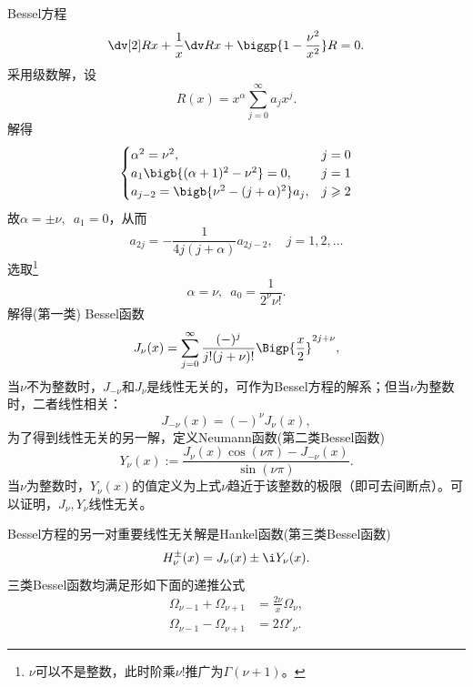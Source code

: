 Bessel方程
\begin{equation}
    \dv[2]Rx+\frac1x\dv Rx+\biggp{1-\frac{\nu^2}{x^2}}R=0.
\end{equation}
采用级数解，设 
\[
    R(x)=x^\alpha\sum_{j=0}^\infty a_jx^j.
\]
解得
\[
    \begin{cases}
        \alpha^2=\nu^2,&j=0\\
        a_1\bigb{(\alpha+1)^2-\nu^2}=0,&j=1\\
        a_{j-2}=\bigb{\nu^2-(j+\alpha)^2}a_j,&j\geqslant 2
    \end{cases}
\]
故$\alpha=\pm\nu,\enspace a_1=0$，从而
\[
    a_{2j}=-\frac1{4j(j+\alpha)}a_{2j-2},\quad j=1,2,\ldots
\]
选取\footnote{$\nu$可以不是整数，此时阶乘$\nu!$推广为$\Gamma(\nu+1)$。}
\[
    \alpha=\nu,\enspace a_0=\frac1{2^\nu\nu!}.
\]
解得(第一类) Bessel函数
\begin{equation}
    J_\nu(x)=\sum_{j=0}^\infty\frac{(-)^j}{j!(j+\nu)!}\Bigp{\frac x2}^{2j+\nu},
\end{equation}
当$\nu$不为整数时，$J_{-\nu}$和$J_\nu$是线性无关的，可作为Bessel方程的解系；但当$\nu$为整数时，二者线性相关：
\[
    J_{-\nu}(x)=(-)^\nu J_\nu(x),
\]
为了得到线性无关的另一解，定义Neumann函数(第二类Bessel函数)
\begin{equation}
    Y_\nu(x):=\frac{J_\nu(x)\cos(\nu\pi)-J_{-\nu}(x)}{\sin(\nu\pi)}.
\end{equation}
当$\nu$为整数时，$Y_\nu(x)$的值定义为上式$\nu$趋近于该整数的极限（即可去间断点）。可以证明，$J_\nu,Y_\nu$线性无关。

Bessel方程的另一对重要线性无关解是Hankel函数(第三类Bessel函数)
\begin{equation}
    H_\nu^\pm(x)=J_\nu(x)\pm\i Y_\nu(x).
\end{equation}
三类Bessel函数均满足形如下面的递推公式
\begin{align*}
    \Omega_{\nu-1}+\Omega_{\nu+1}&=\frac{2\nu}x\Omega_\nu,\\
    \Omega_{\nu-1}-\Omega_{\nu+1}&=2\Omega'_\nu.
\end{align*}


